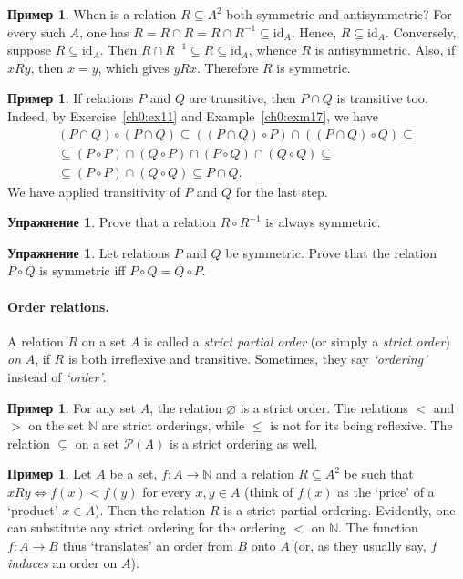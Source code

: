 \documentclass[12pt,notitlepage]{article}
\theoremstyle{plain}
\theoremstyle{definition}
\newtheorem{exc}[thm]{Упражнение}
\newtheorem{exm}[thm]{Пример}
\theoremstyle{plain}
\newcommand{\N}{\mathbb{N}}
\newcommand{\sbs}{\subseteq}
\newcommand{\void}{\varnothing}
\newcommand{\mP}{\mathcal{P}}
\newcommand{\id}{\mathrm{id}}
\newcommand{\1}{\mathbf{1}}
\newcommand{\0}{\mathbf{0}}
\begin{document}
\begin{exm}
	When is a relation $R \sbs A^2$ both symmetric and antisymmetric? For every such $A$, one has $R = R \cap R = R \cap R^{-1} \sbs \id_A$. Hence, $R \sbs \id_A$. Conversely, suppose $R \sbs \id_A$. Then $R \cap R^{-1} \sbs R \sbs \id_A$, whence $R$ is antisymmetric. Also, if $xRy$, then $x = y$, which gives $yRx$. Therefore $R$ is symmetric.
\end{exm}

\begin{exm}\label{ch0:comp_trans}
	If relations $P$ and $Q$ are transitive, then $P \cap Q$ is transitive too. Indeed, by Exercise~\ref{ch0:ex11} and Example~\ref{ch0:exm17}, we have
	\begin{multline*}
		(P \cap Q)\circ(P \cap Q) \sbs ((P \cap Q)\circ P) \cap ((P \cap Q) \circ Q) \sbs\\
		\sbs (P \circ P) \cap (Q \circ P) \cap (P \circ Q) \cap (Q \circ Q) \sbs\\
		\sbs (P \circ P) \cap  (Q \circ Q) \sbs P \cap Q.
	\end{multline*}
	We have applied transitivity of $P$ and $Q$ for the last step.
\end{exm}

\begin{exc}
	Prove that a relation $R \circ R^{-1}$ is always symmetric.
\end{exc}

\begin{exc}
	Let relations $P$ and $Q$ be symmetric. Prove that the relation $P \circ Q$ is symmetric iff $P \circ Q = Q \circ P$.
\end{exc}


\paragraph{Order relations.} A relation $R$ on a set $A$ is called a \emph{strict partial order} (or simply a \emph{strict order}) \emph{on} $A$, if $R$ is both irreflexive and transitive. Sometimes, they say \emph{`ordering'} instead of \emph{`order'}.
\begin{exm}
	For any set  $A$, the relation $\void$ is a strict order. The relations ${<}$ and ${>}$ on the set $\N$ are strict orderings, while ${\leq}$ is not for its being reflexive. The relation ${\subsetneq}$ on a set $\mP(A)$ is a strict ordering as well.
\end{exm}

\begin{exm}\label{ch0:induced0}
	Let $A$ be a set, $f\colon A \to \N$ and a relation $R \sbs A^2$ be such that $x R y \iff f(x) < f(y)$ for every $x, y \in A$ (think of $f(x)$ as the `price' of a `product' $x \in A$). Then the relation $R$ is a strict partial ordering. Evidently, one can substitute any strict ordering for the ordering ${<}$ on $\N$. The function $f\colon A \to B$ thus `translates' an order from $B$ onto $A$ (or, as they usually say, $f$ \emph{induces} an order on $A$).
\end{exm}
\end{document}
